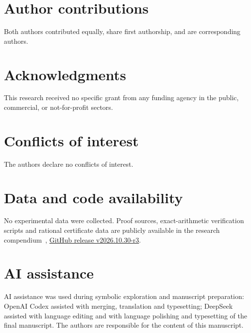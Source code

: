 \section*{Author contributions}
Both authors contributed equally, share first authorship, and are corresponding authors.
\section*{Acknowledgments}
This research received no specific grant from any funding agency in the public, commercial, or not-for-profit sectors.
\section*{Conflicts of interest}
The authors declare no conflicts of interest.
\section*{Data and code availability}
No experimental data were collected. Proof sources, exact-arithmetic verification scripts and rational certificate data are publicly available in the research compendium~\citep{QYCompendium}, \href{https://github.com/E123456829/tournament-anti-sidorenko-five-branch-trees-v2/releases/tag/v2026.10.30-r3}{GitHub release v2026.10.30-r3}.
\section*{AI assistance}
AI assistance was used during symbolic exploration and manuscript preparation: OpenAI Codex assisted with merging, translation and typesetting; DeepSeek assisted with language editing and with language polishing and typesetting of the final manuscript. The authors are responsible for the content of this manuscript.
